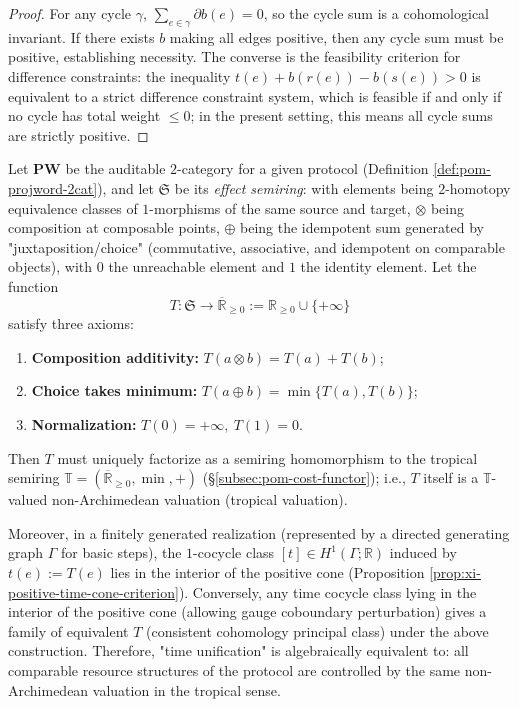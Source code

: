\begin{proof}
For any cycle \(\gamma\), \(\sum_{e\in\gamma}\partial b(e)=0\), so the cycle sum is a cohomological invariant.
If there exists \(b\) making all edges positive, then any cycle sum must be positive, establishing necessity.
The converse is the feasibility criterion for difference constraints: the inequality \(t(e)+b(r(e))-b(s(e))>0\) is equivalent to a strict difference constraint system, which is feasible if and only if no cycle has total weight \(\le 0\); in the present setting, this means all cycle sums are strictly positive.
\end{proof}

\begin{theorem}\label{thm:xi-time-tropicalization-completeness}
Let \(\mathbf{PW}\) be the auditable \(2\)-category for a given protocol (Definition \ref{def:pom-projword-2cat}), and let \(\mathfrak S\) be its \emph{effect semiring}:
with elements being \(2\)-homotopy equivalence classes of \(1\)-morphisms of the same source and target,
\(\otimes\) being composition at composable points,
\(\oplus\) being the idempotent sum generated by "juxtaposition/choice" (commutative, associative, and idempotent on comparable objects), with \(0\) the unreachable element and \(1\) the identity element.
Let the function
\[
T:\mathfrak S\to \overline{\mathbb R}_{\ge 0}:=\mathbb R_{\ge 0}\cup\{+\infty\}
\]
satisfy three axioms:
\begin{enumerate}
  \item \textbf{Composition additivity:} \(T(a\otimes b)=T(a)+T(b)\);
  \item \textbf{Choice takes minimum:} \(T(a\oplus b)=\min\{T(a),T(b)\}\);
  \item \textbf{Normalization:} \(T(0)=+\infty,\ T(1)=0\).
\end{enumerate}
Then \(T\) must uniquely factorize as a semiring homomorphism to the tropical semiring \(\mathbb T=(\overline{\mathbb R}_{\ge 0},\min,+)\) (\S\ref{subsec:pom-cost-functor}); i.e., \(T\) itself is a \(\mathbb T\)-valued non-Archimedean valuation (tropical valuation).
\par
Moreover, in a finitely generated realization (represented by a directed generating graph \(\Gamma\) for basic steps), the \(1\)-cocycle class \([t]\in H^1(\Gamma;\mathbb R)\) induced by \(t(e):=T(e)\) lies in the interior of the positive cone (Proposition \ref{prop:xi-positive-time-cone-criterion}).
Conversely, any time cocycle class lying in the interior of the positive cone (allowing gauge coboundary perturbation) gives a family of equivalent \(T\) (consistent cohomology principal class) under the above construction.
Therefore, "time unification" is algebraically equivalent to: all comparable resource structures of the protocol are controlled by the same non-Archimedean valuation in the tropical sense.
\end{theorem}

